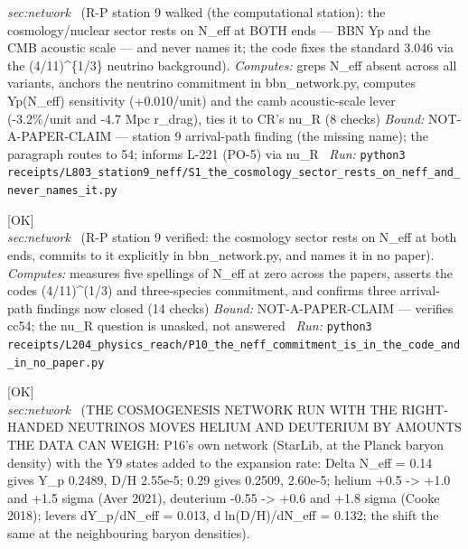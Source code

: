 \begin{description}
\textit{sec:network} \ (R-P station 9 walked (the computational station): the cosmology/nuclear sector rests on N\_eff at BOTH ends --- BBN Yp and the CMB acoustic scale --- and never names it; the code fixes the standard 3.046 via the (4/11)\textasciicircum{}\{1/3\} neutrino background). 
\emph{Computes:} greps N\_eff absent across all variants, anchors the neutrino commitment in bbn\_network.py, computes Yp(N\_eff) sensitivity (+0.010/unit) and the camb acoustic-scale lever (-3.2\%/unit and -4.7 Mpc r\_drag), ties it to CR's nu\_R (8 checks)
 \emph{Bound:} NOT-A-PAPER-CLAIM --- station 9 arrival-path finding (the missing name); the paragraph routes to 54; informs L-221 (PO-5) via nu\_R
\ \emph{Run:} \texttt{python3 receipts/L803\_station9\_neff/S1\_the\_cosmology\_sector\_rests\_on\_neff\_and\_never\_names\_it.py}
\item[\label{rcpt:P10_the_neff_commitment_is_in_the_code_and_in_no_paper}\textbf{}\quad\texttt{P10\_the\_neff\_commitment\_is\_in\_the\_code\_and\_in\_no\_paper}]\hfill\textsf{[OK]}\\
\textit{sec:network} \ (R-P station 9 verified: the cosmology sector rests on N\_eff at both ends, commits to it explicitly in bbn\_network.py, and names it in no paper). 
\emph{Computes:} measures five spellings of N\_eff at zero across the papers, asserts the codes (4/11)\textasciicircum{}(1/3) and three-species commitment, and confirms three arrival-path findings now closed (14 checks)
 \emph{Bound:} NOT-A-PAPER-CLAIM --- verifies cc54; the nu\_R question is unasked, not answered
\ \emph{Run:} \texttt{python3 receipts/L204\_physics\_reach/P10\_the\_neff\_commitment\_is\_in\_the\_code\_and\_in\_no\_paper.py}
\item[\label{rcpt:Y10_the_cosmogenesis_network_run_with_the_right_handed_neutrinos_moves_helium_and_deuterium_by_the_amounts_the_data_can_weigh}\textbf{}\quad\texttt{Y10\_the\_cosmogenesis\_network\_run\_with\_the\_right\_handed\_neutrinos\_moves\_helium\_and\_deuterium\_by\_the\_amounts\_the\_data\_can\_weigh}]\hfill\textsf{[OK]}\\
\textit{sec:network} \ (THE COSMOGENESIS NETWORK RUN WITH THE RIGHT-HANDED NEUTRINOS MOVES HELIUM AND DEUTERIUM BY AMOUNTS THE DATA CAN WEIGH: P16's own network (StarLib, at the Planck baryon density) with the Y9 states added to the expansion rate: Delta N\_eff = 0.14 gives Y\_p 0.2489, D/H 2.55e-5; 0.29 gives 0.2509, 2.60e-5; helium +0.5 -> +1.0 and +1.5 sigma (Aver 2021), deuterium -0.55 -> +0.6 and +1.8 sigma (Cooke 2018); levers dY\_p/dN\_eff = 0.013, d ln(D/H)/dN\_eff = 0.132; the shift the same at the neighbouring baryon densities). 

\end{description}

